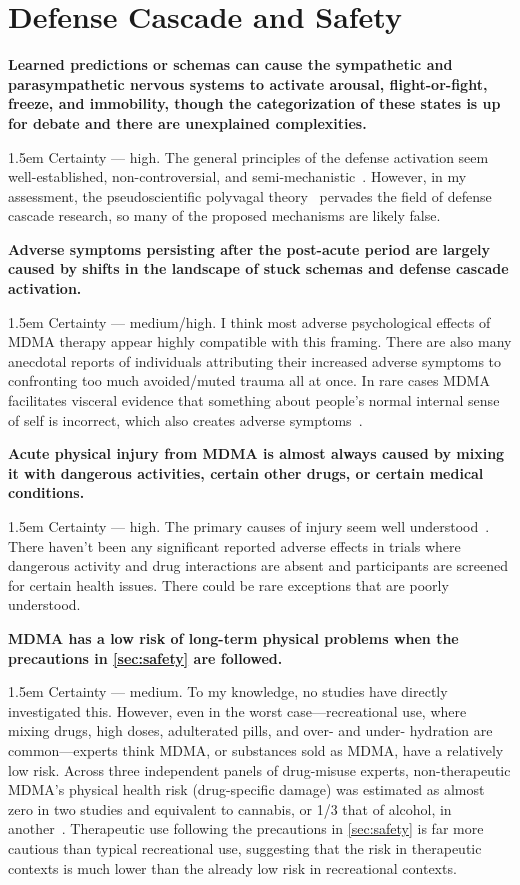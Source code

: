 \documentclass[11pt,oneside]{book}
\let\cite\parencite
\newcommand{\claim}[2]{%
    \par\medskip\noindent\textbf{#1}%
    \begin{adjustwidth}{1.5em}{}%
    \setlength{\parindent}{0pt}%
    \setlength{\parskip}{0.5\baselineskip}%
    #2%
    \end{adjustwidth}%
}
\begin{document}
\section*{Defense Cascade and Safety}
\claim{Learned predictions or schemas can cause the sympathetic and parasympathetic nervous systems to activate arousal, flight-or-fight, freeze, and immobility, though the categorization of these states is up for debate and there are unexplained complexities.}{Certainty --- high. The general principles of the defense activation seem well-established, non-controversial, and semi-mechanistic~\cite{kozlowskaDefenseCascade}. However, in my assessment, the pseudoscientific polyvagal theory~\cite{luckPolyvagal} pervades the field of defense cascade research, so many of the proposed mechanisms are likely false.}
\claim{Adverse symptoms persisting after the post-acute period are largely caused by shifts in the landscape of stuck schemas and defense cascade activation.}{Certainty --- medium/high. I think most adverse psychological effects of MDMA therapy appear highly compatible with this framing. There are also many anecdotal reports of individuals attributing their increased adverse symptoms to confronting too much avoided/muted trauma all at once. In rare cases MDMA facilitates visceral evidence that something about people's normal internal sense of self is incorrect, which also creates adverse symptoms~\cite{ingramMDMA,ingram2018mastering}.}
\claim{Acute physical injury from MDMA is almost always caused by mixing it with dangerous activities, certain other drugs, or certain medical conditions.}{Certainty --- high. The primary causes of injury seem well understood~\cite{wolfgang2025,riggDeaths}. There haven't been any significant reported adverse effects in trials where dangerous activity and drug interactions are absent and participants are screened for certain health issues. There could be rare exceptions that are poorly understood.}
\claim{MDMA has a low risk of long-term physical problems when the precautions in \cref{sec:safety} are followed.}{Certainty --- medium. To my knowledge, no studies have directly investigated this. However, even in the worst case---recreational use, where mixing drugs, high doses, adulterated pills, and over- and under- hydration are common---experts think MDMA, or substances sold as MDMA, have a relatively low risk. Across three independent panels of drug-misuse experts, non-therapeutic MDMA's physical health risk (drug-specific damage) was estimated as almost zero in two studies and equivalent to cannabis, or 1/3 that of alcohol, in another~\cite{bonomoHarms,crossinHarms,nuttDrugHarms}. Therapeutic use following the precautions in \cref{sec:safety} is far more cautious than typical recreational use, suggesting that the risk in therapeutic contexts is much lower than the already low risk in recreational contexts.}
\end{document}
